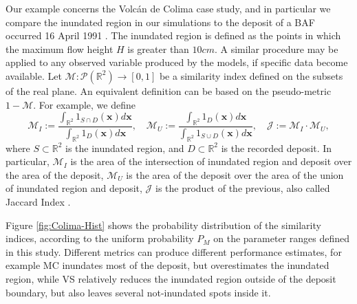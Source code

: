 \documentclass{article}
\begin{document}
Our example concerns the Volc{\'a}n de Colima case study, and in particular we compare the inundated region in our simulations to the deposit of a BAF occurred 16 April 1991 \citep{Saucedo2004, Rupp2004, Rupp2006}. The inundated region is defined as the points in which the maximum flow height $H$ is greater than $10 cm$. A similar procedure may be applied to any observed variable produced by the models, if specific data become available. Let $\mathcal M:\mathcal P(\mathbb R^2)\rightarrow[0,1]$ be a similarity index defined on the subsets of the real plane. An equivalent definition can be based on the pseudo-metric $1-\mathcal M$. For example, we define
$$\mathcal M_I:=\frac{\int_{\mathbb R^2} 1_{S \cap D}(\textbf{x}) d\textbf{x}}{\int_{\mathbb R^2} 1_D(\textbf{x})d\textbf{x}},\quad \mathcal M_U:=\frac{\int_{\mathbb R^2} 1_D(\textbf{x})d\textbf{x}}{\int_{\mathbb R^2} 1_{S \cup D}(\textbf{x}) d\textbf{x}}, \quad \mathcal J:=\mathcal M_I\cdot \mathcal M_U,$$
where $S\subset \mathbb R^2$ is the inundated region, and $D\subset \mathbb R^2$ is the recorded deposit. In particular, $\mathcal M_I$ is the area of the intersection of inundated region and deposit over the area of the deposit, $\mathcal M_U$ is the area of the deposit over the area of the union of inundated region and deposit, $\mathcal J$ is the product of the previous, also called Jaccard Index \citep{Jaccard1901}.

Figure \ref{fig:Colima-Hist} shows the probability distribution of the similarity indices, according to the uniform probability $P_M$ on the parameter ranges defined in this study. Different metrics can produce different performance estimates, for example MC inundates most of the deposit, but overestimates the inundated region, while VS relatively reduces the inundated region outside of the deposit boundary, but also leaves several not-inundated spots inside it.
\end{document}
